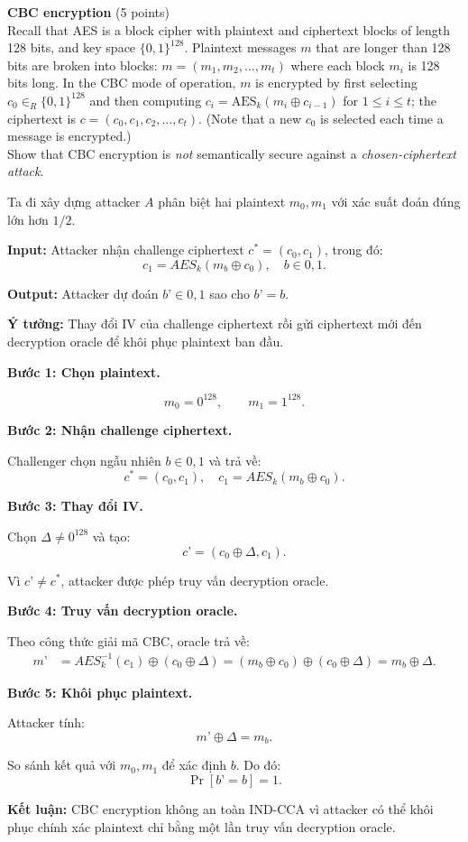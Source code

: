 \begin{problem}{\bf CBC encryption} (5 points)\\
Recall that AES is a block cipher with plaintext and ciphertext blocks
of length 128 bits, and key space $\{0,1\}^{128}$. Plaintext messages
$m$ that are longer than 128 bits are broken into blocks:
$m = (m_1,m_2,\ldots,m_t)$ where each block $m_i$ is 128 bits long.
In the CBC mode of operation, $m$ is encrypted by first selecting
$c_0 \in_R \{0,1\}^{128}$ and then computing
$c_i = \mbox{AES}_k(m_i \oplus c_{i-1})$ for $1 \leq i \leq t$;
the ciphertext is $c=(c_0,c_1,c_2,\ldots,c_t)$.
(Note that a new $c_0$ is selected each time a message is encrypted.)\\
Show that CBC encryption is \emph{not} semantically secure against
a \emph{chosen-ciphertext attack}.
\end{problem}

\begin{loigiai}
Ta đi xây dựng attacker $A$ phân biệt hai plaintext $m_0,m_1$ với xác suất đoán đúng lớn hơn $1/2$.

\textbf{Input:} Attacker nhận challenge ciphertext $c^*=(c_0,c_1)$, trong đó:
$$c_1=AES_k(m_b\oplus c_0),\quad b\in{0,1}.$$

\textbf{Output:} Attacker dự đoán $b’\in{0,1}$ sao cho $b’=b$.

\textbf{Ý tưởng:} Thay đổi IV của challenge ciphertext rồi gửi ciphertext mới đến decryption oracle để khôi phục plaintext ban đầu.

\textbf{Bước 1: Chọn plaintext.}

$$m_0=0^{128},\qquad m_1=1^{128}.$$

\textbf{Bước 2: Nhận challenge ciphertext.}

Challenger chọn ngẫu nhiên $b\in{0,1}$ và trả về:
$$c^*=(c_0,c_1),\quad c_1=AES_k(m_b\oplus c_0).$$

\textbf{Bước 3: Thay đổi IV.}

Chọn $\Delta\neq 0^{128}$ và tạo:
$$c’=(c_0\oplus\Delta,c_1).$$

Vì $c’\neq c^*$, attacker được phép truy vấn decryption oracle.

\textbf{Bước 4: Truy vấn decryption oracle.}

Theo công thức giải mã CBC, oracle trả về:
$$
\begin{aligned}
m’&=AES_k^{-1}(c_1)\oplus(c_0\oplus\Delta)=(m_b\oplus c_0)\oplus(c_0\oplus\Delta)=m_b\oplus\Delta.
\end{aligned}
$$

\textbf{Bước 5: Khôi phục plaintext.}

Attacker tính:
$$m’\oplus\Delta=m_b.$$

So sánh kết quả với $m_0,m_1$ để xác định $b$. Do đó:
$$\Pr[b’=b]=1.$$

\textbf{Kết luận:} CBC encryption không an toàn IND-CCA vì attacker có thể khôi phục chính xác plaintext chỉ bằng một lần truy vấn decryption oracle.
\end{loigiai}
